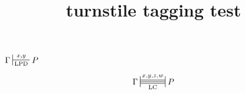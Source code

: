 \documentclass{article}
\title{turnstile tagging test}
\begin{document}
$\Gamma \sststile{\mathrm{LPD}}{x,y} P$

\[\Gamma \stststile{\mathrm{LC}}{x,y,z,w} P\]
\end{document}
